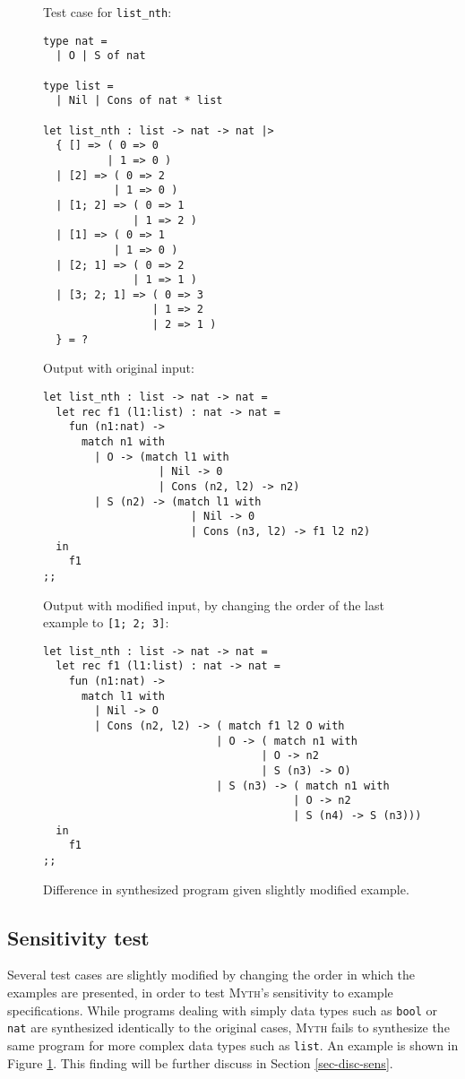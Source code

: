 \documentclass[preprint, 11pt]{sigplanconf}
\begin{document}
\begin{figure}[!ht]
  \noindent \small Test case for \texttt{list\_nth}:
  \scriptsize
  \begin{verbatim}
type nat =
  | O | S of nat

type list =
  | Nil | Cons of nat * list

let list_nth : list -> nat -> nat |>
  { [] => ( 0 => 0
          | 1 => 0 )
  | [2] => ( 0 => 2
           | 1 => 0 )
  | [1; 2] => ( 0 => 1
              | 1 => 2 )
  | [1] => ( 0 => 1
           | 1 => 0 )
  | [2; 1] => ( 0 => 2
              | 1 => 1 )
  | [3; 2; 1] => ( 0 => 3
                 | 1 => 2
                 | 2 => 1 )
  } = ?
  \end{verbatim}

  \noindent \small Output with original input:
  \scriptsize
  \begin{verbatim}
let list_nth : list -> nat -> nat =
  let rec f1 (l1:list) : nat -> nat =
    fun (n1:nat) ->
      match n1 with
        | O -> (match l1 with
                  | Nil -> 0
                  | Cons (n2, l2) -> n2)
        | S (n2) -> (match l1 with
                       | Nil -> 0
                       | Cons (n3, l2) -> f1 l2 n2)
  in
    f1
;;
  \end{verbatim}

  \noindent \small Output with modified input, by changing the order of the last example to \texttt{[1; 2; 3]}:
  \scriptsize
  \begin{verbatim}
let list_nth : list -> nat -> nat =
  let rec f1 (l1:list) : nat -> nat =
    fun (n1:nat) ->
      match l1 with
        | Nil -> O
        | Cons (n2, l2) -> ( match f1 l2 O with
                           | O -> ( match n1 with
                                  | O -> n2
                                  | S (n3) -> O)
                           | S (n3) -> ( match n1 with
                                       | O -> n2
                                       | S (n4) -> S (n3)))
  in
    f1
;;
  \end{verbatim}
  \caption{Difference in synthesized program given slightly modified example.}
  \label{fig-sensitivity}
\end{figure}

\subsection{Sensitivity test}\label{sec-sens}


Several test cases are slightly modified by changing the order in which the examples are presented, in order to test \textsc{Myth}'s sensitivity to example specifications. While programs dealing with simply data types such as \texttt{bool} or \texttt{nat} are synthesized identically to the original cases, \textsc{Myth} fails to synthesize the same program for more complex data types such as \texttt{list}. An example is shown in Figure \ref{fig-sensitivity}. This finding will be further discuss in Section \ref{sec-disc-sens}.\\
\end{document}
